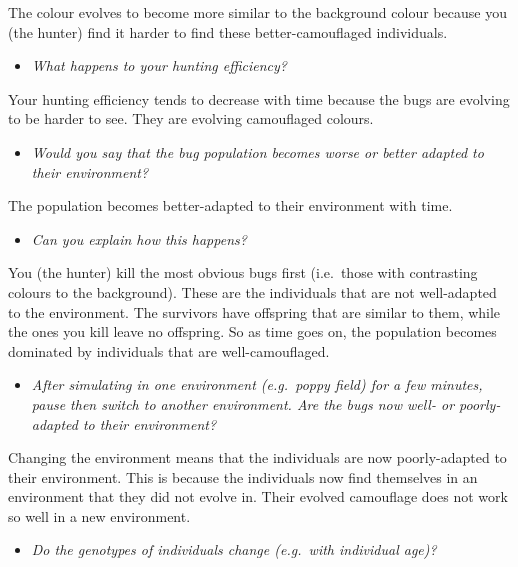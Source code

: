 \documentclass[
  a4paper]{book}
\providecommand{\tightlist}{%
  \setlength{\itemsep}{0pt}\setlength{\parskip}{0pt}}
\begin{document}
The colour evolves to become more similar to the background colour because you (the hunter) find it harder to find these better-camouflaged individuals.

\begin{itemize}
\tightlist
\item
  \emph{What happens to your hunting efficiency?}
\end{itemize}

Your hunting efficiency tends to decrease with time because the bugs are evolving to be harder to see. They are evolving camouflaged colours.

\begin{itemize}
\tightlist
\item
  \emph{Would you say that the bug population becomes worse or better adapted to their environment?}
\end{itemize}

The population becomes better-adapted to their environment with time.

\begin{itemize}
\tightlist
\item
  \emph{Can you explain how this happens?}
\end{itemize}

You (the hunter) kill the most obvious bugs first (i.e.~those with contrasting colours to the background). These are the individuals that are not well-adapted to the environment. The survivors have offspring that are similar to them, while the ones you kill leave no offspring. So as time goes on, the population becomes dominated by individuals that are well-camouflaged.

\begin{itemize}
\tightlist
\item
  \emph{After simulating in one environment (e.g.~poppy field) for a few minutes, pause then switch to another environment. Are the bugs now well- or poorly-adapted to their environment?}
\end{itemize}

Changing the environment means that the individuals are now poorly-adapted to their environment. This is because the individuals now find themselves in an environment that they did not evolve in. Their evolved camouflage does not work so well in a new environment.

\begin{itemize}
\tightlist
\item
  \emph{Do the genotypes of individuals change (e.g.~with individual age)?}
\end{itemize}
\end{document}
